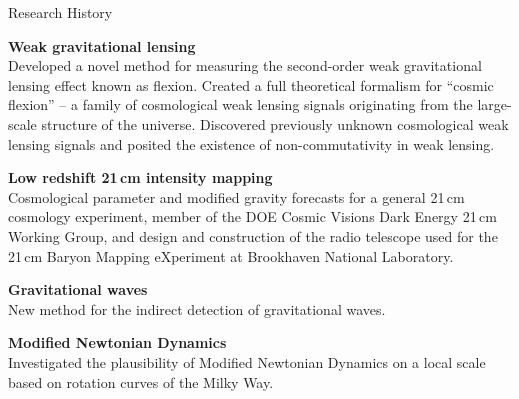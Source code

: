 \documentclass{resume} %
\begin{document}
\begin{rSection}{Research History}

\begin{description}[leftmargin=8em, style=nextline]

\item[\textnormal{2018 -- Present}] \textbf{Weak gravitational lensing}\\
  Developed a novel method for measuring the second-order weak gravitational lensing effect known as flexion.
  Created a full theoretical formalism for ``cosmic flexion'' -- a family of cosmological weak lensing signals originating from the large-scale structure of the universe.  Discovered previously unknown cosmological weak lensing signals and posited the existence of non-commutativity in weak lensing. 
 
  
\item[\textnormal{2015 -- 2019}] \textbf{Low redshift 21$\,$cm intensity mapping}\\
 Cosmological parameter and modified gravity forecasts for a general 21$\,$cm cosmology 
 experiment, member of the DOE Cosmic Visions Dark Energy 21$\,$cm Working Group, and design and construction
 of the radio telescope used for the 21$\,$cm Baryon Mapping eXperiment at Brookhaven National
 Laboratory.
\item[\textnormal{2013}] \textbf{Gravitational waves}\\
  New method for the indirect detection of gravitational waves.
  
\item[\textnormal{2012}] \textbf{Modified Newtonian Dynamics}\\
 Investigated the plausibility of Modified Newtonian Dynamics on a local scale based on
 rotation curves of the Milky Way.

\end{description}

\end{rSection}

\end{document}
